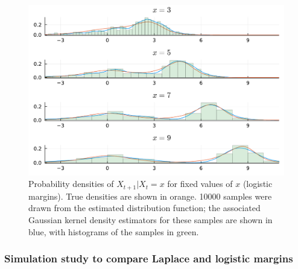 \documentclass[11pt,twoside,openany]{book}
\numberwithin{Theorem}{chapter}
\numberwithin{Definition}{chapter}
\numberwithin{Lemma}{chapter}
\numberwithin{Algorithm}{chapter}
\numberwithin{equation}{chapter}
\begin{document}
\begin{figure}[htp]
  \centering
  \includegraphics[scale=0.7]{../ht-em/figures/worked_example_logistic_vs_true_resids.pdf
}
  \caption{Probability densities of $X_{t+1}|X_{t}=x$ for fixed values of $x$ (logistic margins).
    True densities are shown in orange. 10000 samples were drawn from the
    estimated distribution function; the associated Gaussian kernel density estimators
    for these samples are shown in blue, with histograms of the samples in green.
   }\label{fig:worked_example_logistic_vs_true_resids}
\end{figure}

\FloatBarrier
\clearpage
\subsubsection{Simulation study to compare Laplace and logistic margins}\label{sec:lap_vs_log}
\end{document}
